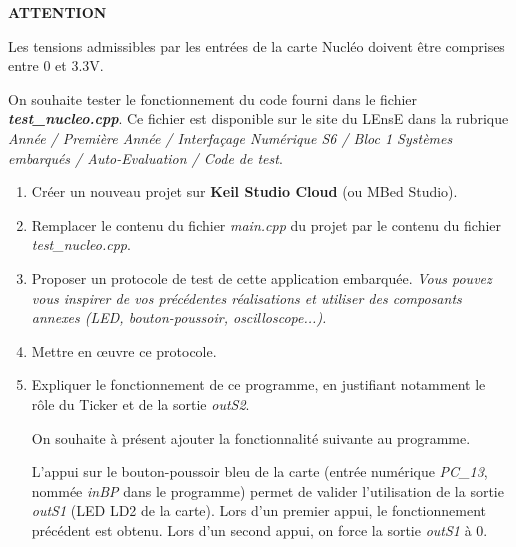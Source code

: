 \documentclass[a4paper]{book}%
\begin{document}

		




	\noindent \hrulefill
	
	\begin{large}

\textbf{ATTENTION}

Les tensions admissibles par les entrées de la carte Nucléo doivent être comprises entre 0 et 3.3V.
	
	\end{large}

	\noindent \hrulefill
	
	
	\begin{large}

On souhaite tester le fonctionnement du code fourni dans le fichier 
\textsl{\textbf{test\_nucleo.cpp}}. Ce fichier est disponible sur le site du LEnsE dans la rubrique \textit{Année / Première Année / Interfaçage Numérique S6 / Bloc 1 Systèmes embarqués / Auto-Evaluation / Code de test}.
	
	\begin{enumerate}
		\item Créer un nouveau projet sur \textbf{Keil Studio Cloud} (ou MBed Studio).
		\item Remplacer le contenu du fichier \textsl{main.cpp} du projet par le contenu du fichier \textsl{test\_nucleo.cpp}.
		\item Proposer un protocole de test de cette application embarquée. \textit{Vous pouvez vous inspirer de vos précédentes réalisations et utiliser des composants annexes (LED, bouton-poussoir, oscilloscope...).}
		
		\medskip
		
		\item Mettre en \oe{}uvre ce protocole.
		\item Expliquer le fonctionnement de ce programme, en justifiant notamment le rôle du \textsf{Ticker} et de la sortie \textsl{outS2}.
		
	\bigskip
	
	
On souhaite à présent ajouter la fonctionnalité suivante au programme.

L'appui sur le bouton-poussoir bleu de la carte (entrée numérique \textsl{PC\_13}, nommée \textsl{inBP} dans le programme) permet de valider l'utilisation de la sortie \textsl{outS1} (LED LD2 de la carte). Lors d'un premier appui, le fonctionnement précédent
est obtenu. Lors d'un second appui, on force la sortie \textsl{outS1} à 0.
	

\end{enumerate}
\end{large}
\end{document}

